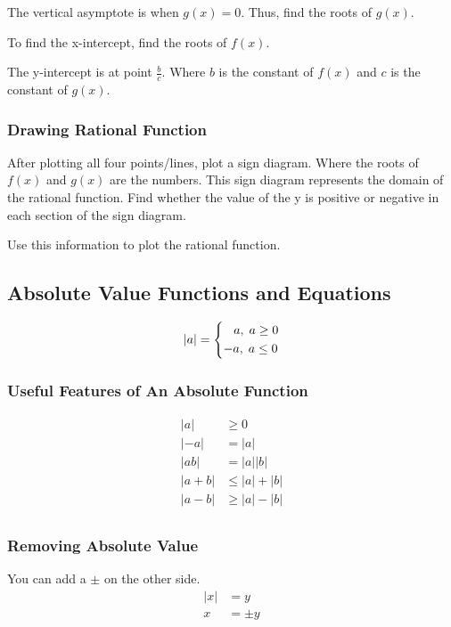 \documentclass[../notes.tex]{subfiles}
\begin{document}
The vertical asymptote is when $g(x) = 0$.
Thus, find the roots of $g(x)$.

To find the x-intercept, find the roots of $f(x)$.

The y-intercept is at point $\frac{b}{c}$.
Where $b$ is the constant of $f(x)$ and  $c$ is the constant of $g(x)$. 

\subsubsection{Drawing Rational Function}
After plotting all four points/lines, plot a sign diagram.
Where the roots of $f(x)$ and $g(x)$ are the numbers.
This sign diagram represents the domain of the rational function.
Find whether the value of the y is positive or negative in each section of the sign diagram.

Use this information to plot the rational function.

\subsection{Absolute Value Functions and Equations}
\begin{equation}
	|a| = 
	\begin{dcases}
		\;\;\;a,\; a \ge 0 \\
		-a,\; a \le 0 \\
	\end{dcases}
\end{equation}

\subsubsection{Useful Features of An Absolute Function}
\begin{align}
	|a| &\ge 0 \\
	|-a| &= |a| \\
	|ab| &= |a||b| \\
	|a+b| &\le |a| + |b| \\
	|a-b| &\ge |a| - |b| \\
\end{align} 

\subsubsection{Removing Absolute Value}
You can add a $\pm$ on the other side. 
\begin{align*}
	|x| &= y \\
	x &= \pm y
\end{align*} 
\end{document}
